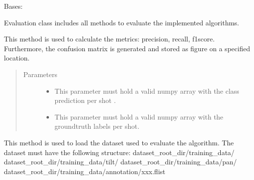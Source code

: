 \documentclass[letterpaper,10pt,english,openany,oneside]{sphinxmanual}
\begin{document}
\begin{fulllineitems}
\label{\detokenize{Evaluation:cmc.Evaluation.Evaluation}}
Bases: 

Evaluation class includes all methods to evaluate the implemented algorithms.

\begin{fulllineitems}
\label{\detokenize{Evaluation:cmc.Evaluation.Evaluation.calculate_metrics}}
This method is used to calculate the metrics: precision, recall, f1score.
Furthermore, the confusion matrix is generated and stored as figure on a specified location.
\begin{quote}\begin{description}
\item[{Parameters}] \leavevmode\begin{itemize}
\item {} 
 \textendash{} This parameter must hold a valid numpy array with the class prediction per shot .

\item {} 
 \textendash{} This parameter must hold a valid numpy array with the groundtruth labels per shot.

\end{itemize}

\end{description}\end{quote}

\end{fulllineitems}


\begin{fulllineitems}
\label{\detokenize{Evaluation:cmc.Evaluation.Evaluation.load_dataset}}
This method is used to load the dataset used to evaluate the algorithm.
The dataset must have the following structure:
dataset\_root\_dir/training\_data/
dataset\_root\_dir/training\_data/tilt/
dataset\_root\_dir/training\_data/pan/
dataset\_root\_dir/training\_data/annotation/xxx.flist


\end{fulllineitems}
\end{fulllineitems}
\end{document}
